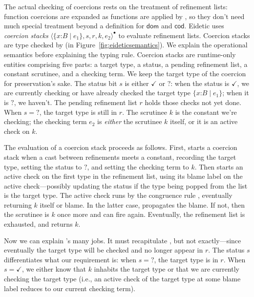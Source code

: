 \documentclass[9pt]{extarticle}
\newcommand{\ottnt}[1]{\mathit{#1}}
\newcommand{\ottsym}[1]{#1}
\begin{document}
The actual checking of coercions rests on the treatment of refinement
lists: function coercions are expanded as functions are applied by
, so they don't need much special treatment beyond a
definition for $ \mathsf{dom} $ and $ \mathsf{cod} $.
Eidetic \lambdah uses \textit{coercion stacks}
$ \langle   \{ \mathit{x} \mathord{:} \ottnt{B} \mathrel{\mid} \ottnt{e_{{\mathrm{1}}}} \}  ,  \ottnt{s} ,  \ottnt{r} ,  \ottnt{k} ,  \ottnt{e_{{\mathrm{2}}}}  \rangle^{\bullet} $ to evaluate refinement lists. Coercion
stacks are type checked by  (in
Figure~\ref{fig:eideticsemantics}). We explain the operational
semantics before explaining the typing rule.
Coercion stacks are runtime-only entities comprising five parts: a
target type, a status, a pending refinement list, a constant
scrutinee, and a checking term.
We keep the target type of the coercion for preservation's sake.
The status bit $\ottnt{s}$ is either $ \mathord{\checkmark} $ or $ \mathord{?} $: when the status
is $ \mathord{\checkmark} $, we are currently checking or have already checked the
target type $ \{ \mathit{x} \mathord{:} \ottnt{B} \mathrel{\mid} \ottnt{e_{{\mathrm{1}}}} \} $; when it is $ \mathord{?} $, we haven't.
The pending refinement list $\ottnt{r}$ holds those checks not yet
done. When $\ottnt{s}  \ottsym{=}   \mathord{?} $, the target type is still in $\ottnt{r}$.
The scrutinee $\ottnt{k}$ is the constant we're checking; the checking
term $\ottnt{e_{{\mathrm{2}}}}$ is \textit{either} the scrutinee $\ottnt{k}$ itself, or it is
an active check on $\ottnt{k}$.

The evaluation of a coercion stack proceeds as follows.
First,  starts a coercion stack when a cast between
refinements meets a constant, recording the target type, setting the
status to $ \mathord{?} $, and setting the checking term to $\ottnt{k}$.
Then  starts an active check on the first type in the
refinement list, using its blame label on the active check---possibly
updating the status if the type being popped from the list is the
target type. The active check runs by the congruence rule ,
eventually returning $\ottnt{k}$ itself or blame. In the latter case,
 propagates the blame. If not, then the scrutinee is
$\ottnt{k}$ once more and  can fire again.
Eventually, the refinement list is exhausted, and 
returns $\ottnt{k}$.

Now we can explain 's many jobs. It must recapitulate
, but not exactly---since eventually the target type will be
checked and no longer appear in $\ottnt{r}$. The status $\ottnt{s}$ differentiates
what our requirement is: when $\ottnt{s}  \ottsym{=}   \mathord{?} $, the target type is in
$\ottnt{r}$. When $\ottnt{s}  \ottsym{=}   \mathord{\checkmark} $, we either know that $\ottnt{k}$ inhabits the
target type or that we are currently checking the target type (i.e.,
an active check of the target type at some blame label reduces to our
current checking term).
\end{document}
